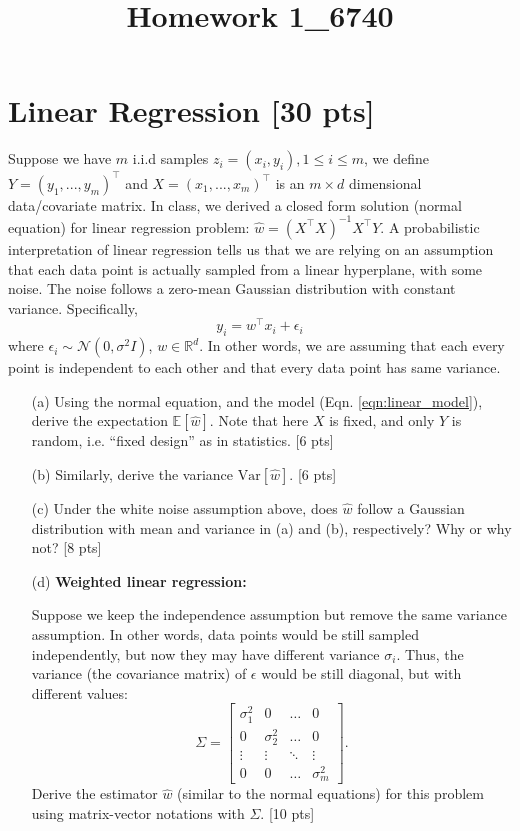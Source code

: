\documentclass[12pt]{article}
\title{Homework 1_6740}
\begin{document}
\MakeScribeTop


\section{Linear Regression [30 pts]}

Suppose we have $m$ i.i.d samples $z_i = (x_i, y_i), 1\leq i\leq m$, we define $Y = (y_1, ..., y_m)^\top$ and $X = (x_1, ..., x_m)^\top$ is an $m \times d$ dimensional data/covariate matrix. In class, we derived a closed form solution (normal equation) for
linear regression problem: $\hat{w} = (X^\top X)^{-1} X^\top Y$. A
probabilistic interpretation of linear regression tells us that we
are relying on an assumption that each data point is actually
sampled from a linear hyperplane, with some noise. The noise
follows a zero-mean Gaussian distribution with constant variance.
Specifically,
\begin{equation}
y_i = w^\top x_i + \epsilon_i
\label{eqn:linear_model}
\end{equation}
where $\epsilon_i \sim \mathcal{N}(0, \sigma^2 I)$, $w \in \mathbb{R}^d.$ In other words,
we are assuming that each every point is independent to each other
and that every data point has same variance.
\begin{itemize}
	\item[(a)] Using the normal equation, and the model (Eqn. \ref{eqn:linear_model}), derive the expectation
$\mathbb{E}[\hat{w}]$. Note that here $X$ is fixed, and only $Y$ is random, i.e. ``fixed design'' as in statistics. [6 pts]
\item[(b)] Similarly, derive the variance $\text{Var}[\hat{w}]$. [6 pts]

\item[(c)] Under the white noise assumption above, does $\hat{w}$ follow a Gaussian
distribution with mean and variance in (a) and (b), respectively? Why or why not? [8 pts]

\item[(d)] \textbf{Weighted linear regression:}

Suppose we keep the independence assumption but
remove the same variance assumption. In other words, data points would be
still sampled independently, but now they may have different
variance $\sigma_i$. Thus, the variance (the covariance matrix) of $\epsilon$ would be still
diagonal, but with different values:
\begin{equation}
\Sigma = \begin{bmatrix}
\sigma_1^2 & 0 & \dots & 0\\
0 & \sigma_2^2& \dots & 0\\
\vdots & \vdots & \ddots & \vdots\\
0 & 0 & \dots & \sigma_m^2
\end{bmatrix}.
\end{equation}
Derive the estimator $\hat{w}$ (similar to the normal equations) for this problem using matrix-vector
notations with $\Sigma$. [10 pts]



\end{itemize}
\end{document}
